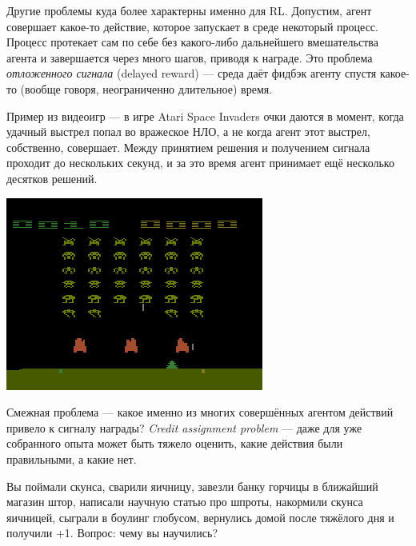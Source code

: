 Другие проблемы куда более характерны именно для RL. Допустим, агент совершает какое-то действие, которое запускает в среде некоторый процесс. Процесс протекает сам по себе без какого-либо дальнейшего вмешательства агента и завершается через много шагов, приводя к награде. Это проблема \emph{отложенного сигнала} (delayed reward) --- среда даёт фидбэк агенту спустя какое-то (вообще говоря, неограниченно длительное) время.

\begin{exampleBox}[righthand ratio=0.25, sidebyside, sidebyside align=center, lower separated=false]{}
Пример из видеоигр --- в игре Atari Space Invaders очки даются в момент, когда удачный выстрел попал во вражеское НЛО, а не когда агент этот выстрел, собственно, совершает. Между принятием решения и получением сигнала проходит до нескольких секунд, и за это время агент принимает ещё несколько десятков решений.

\tcblower
\includegraphics[width=\textwidth]{Images/SpaceInvaders.png}
\end{exampleBox}

Смежная проблема --- какое именно из многих совершённых агентом действий привело к сигналу награды? \emph{Credit assignment problem} --- даже для уже собранного опыта может быть тяжело оценить, какие действия были правильными, а какие нет. 

\begin{example}
Вы поймали скунса, сварили яичницу, завезли банку горчицы в ближайший магазин штор, написали научную статью про шпроты, накормили скунса яичницей, сыграли в боулинг глобусом, вернулись домой после тяжёлого дня и получили +1. Вопрос: чему вы научились? 
\end{example}

